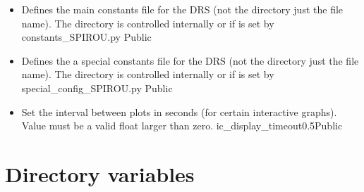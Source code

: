 \begin{itemize}
\item {} 
{Defines the main constants file for the DRS (not the directory just the file name). The directory is controlled internally or if  is set by }{constants\_SPIROU.py}
{\AllRecipes}{\configtxtfile}{\AllRecipes}{Public}


\item {}
{Defines the a special constants file for the DRS (not the directory just the file name). The directory is controlled internally or if  is set by }{special\_config\_SPIROU.py}
{\AllRecipes}{\configtxtfile}{\AllRecipes}{Public}

\item {}
{Set the interval between plots in seconds (for certain interactive graphs). Value must be a valid float larger than zero.}
{ic\_display\_timeout}{0.5}{\callocRAW}{\constantsfile}{}{Public}

\end{itemize}






\section{Directory variables}
\label{ch:variables:directory}

